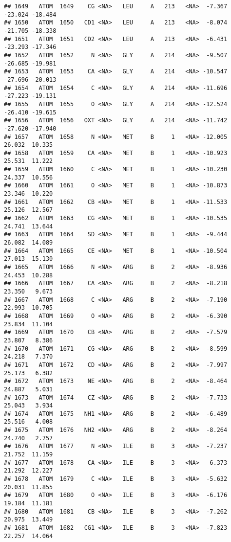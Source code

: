 \documentclass[
]{article}
\begin{document}
\begin{verbatim}
## 1649   ATOM  1649    CG <NA>   LEU     A   213   <NA>  -7.367 -23.024 -18.484
## 1650   ATOM  1650   CD1 <NA>   LEU     A   213   <NA>  -8.074 -21.705 -18.338
## 1651   ATOM  1651   CD2 <NA>   LEU     A   213   <NA>  -6.431 -23.293 -17.346
## 1652   ATOM  1652     N <NA>   GLY     A   214   <NA>  -9.507 -26.685 -19.981
## 1653   ATOM  1653    CA <NA>   GLY     A   214   <NA> -10.547 -27.696 -20.013
## 1654   ATOM  1654     C <NA>   GLY     A   214   <NA> -11.696 -27.223 -19.131
## 1655   ATOM  1655     O <NA>   GLY     A   214   <NA> -12.524 -26.410 -19.615
## 1656   ATOM  1656   OXT <NA>   GLY     A   214   <NA> -11.742 -27.620 -17.940
## 1657   ATOM  1658     N <NA>   MET     B     1   <NA> -12.005  26.032  10.335
## 1658   ATOM  1659    CA <NA>   MET     B     1   <NA> -10.923  25.531  11.222
## 1659   ATOM  1660     C <NA>   MET     B     1   <NA> -10.230  24.337  10.556
## 1660   ATOM  1661     O <NA>   MET     B     1   <NA> -10.873  23.346  10.220
## 1661   ATOM  1662    CB <NA>   MET     B     1   <NA> -11.533  25.126  12.567
## 1662   ATOM  1663    CG <NA>   MET     B     1   <NA> -10.535  24.741  13.644
## 1663   ATOM  1664    SD <NA>   MET     B     1   <NA>  -9.444  26.082  14.089
## 1664   ATOM  1665    CE <NA>   MET     B     1   <NA> -10.504  27.013  15.130
## 1665   ATOM  1666     N <NA>   ARG     B     2   <NA>  -8.936  24.453  10.288
## 1666   ATOM  1667    CA <NA>   ARG     B     2   <NA>  -8.218  23.350   9.673
## 1667   ATOM  1668     C <NA>   ARG     B     2   <NA>  -7.190  22.993  10.705
## 1668   ATOM  1669     O <NA>   ARG     B     2   <NA>  -6.390  23.834  11.104
## 1669   ATOM  1670    CB <NA>   ARG     B     2   <NA>  -7.579  23.807   8.386
## 1670   ATOM  1671    CG <NA>   ARG     B     2   <NA>  -8.599  24.218   7.370
## 1671   ATOM  1672    CD <NA>   ARG     B     2   <NA>  -7.997  25.173   6.382
## 1672   ATOM  1673    NE <NA>   ARG     B     2   <NA>  -8.464  24.887   5.031
## 1673   ATOM  1674    CZ <NA>   ARG     B     2   <NA>  -7.733  25.043   3.934
## 1674   ATOM  1675   NH1 <NA>   ARG     B     2   <NA>  -6.489  25.516   4.008
## 1675   ATOM  1676   NH2 <NA>   ARG     B     2   <NA>  -8.264  24.740   2.757
## 1676   ATOM  1677     N <NA>   ILE     B     3   <NA>  -7.237  21.752  11.159
## 1677   ATOM  1678    CA <NA>   ILE     B     3   <NA>  -6.373  21.292  12.227
## 1678   ATOM  1679     C <NA>   ILE     B     3   <NA>  -5.632  20.031  11.855
## 1679   ATOM  1680     O <NA>   ILE     B     3   <NA>  -6.176  19.184  11.181
## 1680   ATOM  1681    CB <NA>   ILE     B     3   <NA>  -7.262  20.975  13.449
## 1681   ATOM  1682   CG1 <NA>   ILE     B     3   <NA>  -7.823  22.257  14.064

\end{verbatim}
\end{document}
